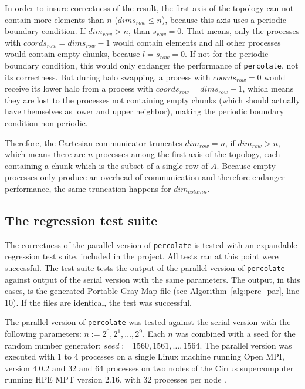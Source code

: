 \documentclass[twoside,11pt]{article}
\def\perc{\texttt{perco\-late}}
\begin{document}
In order to insure correctness of the result, the first
axis of the topology can not contain more elements than $n$
($dims_{row} \leq n$), because this axis uses a periodic
boundary condition.
If $dim_{row} > n$, than $s_{row} = 0$. That means, only
the processes with $coords_{row} = dims_{row} - 1$ would
contain elements and all other processes would contain
empty chunks, because $l = s_{row} = 0$.
If not for the periodic boundary condition, this would only
endanger the performance of \perc{}, not its correctness.
But during halo swapping, a process with $coords_{row} = 0$
would receive its lower halo from a process with
$coords_{row} = dims_{row} - 1$, which means they are
lost to the processes not containing empty chunks
(which should actually have themselves as lower and upper
neighbor), making the periodic boundary condition
non-periodic.

Therefore, the Cartesian communicator truncates
$dim_{row} = n$, if $dim_{row} > n$, which means there are
$n$ processes among the first axis of the topology, each
containing a chunk which is the subset of a single row of
$A$.
Because empty processes only produce an overhead of
communication and therefore endanger performance, the same
truncation happens for $dim_{column}$.



\subsection{The regression test suite}

The correctness of the parallel version of \perc{} is
tested with an expandable regression test suite, included
in the project.
All tests ran at this point were successful.
The test suite tests the output of the parallel version of
\perc{} against output of the serial version with the same
parameters.
The output, in this cases, is the generated Portable Gray
Map file (see Algorithm~\ref{alg:perc_par}, line 10).
If the files are identical, the test was successful.

The parallel version of \perc{} was tested against the
serial version with the following parameters:
$n := 2^0, 2^1,\dots,2^9$.
Each $n$ was combined with a seed for the random number
generator: $seed := 1560, 1561,\dots, 1564$.
The parallel version was executed with 1 to 4 processes on
a single Linux machine running Open MPI, version $4.0.2$
and 32 and 64 processes on two nodes of the Cirrus
supercomputer running HPE MPT version 2.16, with 32
processes per node \citep[see][]{openmpi, cirrus}.
\end{document}
